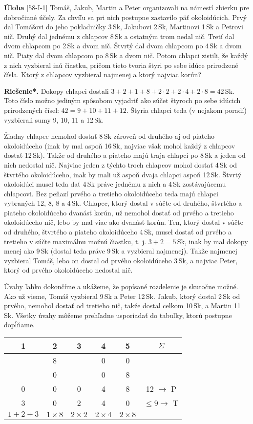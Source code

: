 \documentclass{article}
\newcommand{\rieh}{\textbf{Riešenie*.} }
\newcommand{\problem}[3]{
  \begin{tcolorbox}[breakable,notitle,boxrule=0pt,colback=light-gray,colframe=light-gray]
    \textbf{Úloha}
    [#1] #2
  \end{tcolorbox}
  \noindent#3
}
\begin{document}
\problem{58-I-1}{
Tomáš, Jakub, Martin a Peter organizovali na námestí zbierku pre dobročinné účely. Za chvíľu sa pri nich postupne zastavilo päť okoloidúcich. Prvý dal Tomášovi do jeho pokladničky 3\,Sk, Jakubovi 2\,Sk, Martinovi 1\,Sk a Petrovi nič. Druhý dal jednému
z chlapcov 8\,Sk a ostatným trom nedal nič. Tretí dal dvom chlapcom po 2\,Sk a dvom nič. Štvrtý dal dvom chlapcom po 4\,Sk a dvom nič. Piaty dal dvom chlapcom po 8\,Sk a dvom nič. Potom chlapci zistili, že každý z nich vyzbieral inú čiastku, pričom tieto
tvoria štyri po sebe idúce prirodzené čísla. Ktorý z chlapcov vyzbieral najmenej a ktorý
najviac korún?
}{
\rieh Dokopy chlapci dostali $3 + 2 + 1 + 8 + 2 \cdot 2 + 2 \cdot 4 + 2 \cdot 8 = 42$\,Sk. Toto
číslo možno jediným spôsobom vyjadriť ako súčet štyroch po sebe idúcich prirodzených
čísel: $42 = 9 + 10 + 11 + 12$. Štyria chlapci teda (v nejakom poradí) vyzbierali sumy 9,
10, 11 a 12\,Sk.

Žiadny chlapec nemohol dostať 8\,Sk zároveň od druhého aj od piateho okoloidúceho
(inak by mal aspoň 16\,Sk, najviac však mohol každý z chlapcov dostať 12\,Sk). Takže od
druhého a piateho majú traja chlapci po 8\,Sk a jeden od nich nedostal nič. Najviac jeden
z týchto troch chlapcov mohol dostať 4\,Sk od štvrtého okoloidúceho, inak by mali už
aspoň dvaja chlapci aspoň 12\,Sk. Štvrtý okoloidúci musel teda dať 4\,Sk práve jednému
z nich a 4\,Sk zostávajúcemu chlapcovi. Bez peňazí prvého a tretieho okoloidúceho
teda majú chlapci vybraných 12, 8, 8 a 4\,Sk. Chlapec, ktorý dostal v súčte od druhého,
štvrtého a piateho okoloidúceho dvanásť korún, už nemohol dostať od prvého a tretieho
okoloidúceho nič, lebo by mal viac ako dvanásť korún. Ten, ktorý dostal v súčte od
druhého, štvrtého a piateho okoloidúceho 4\,Sk, musel dostať od prvého a tretieho v súčte
maximálnu možnú čiastku, t. j. $3+2 = 5$\,Sk, inak by mal dokopy menej ako 9\,Sk (dostal
teda práve 9\,Sk a vyzbieral najmenej). Takže najmenej vyzbieral Tomáš, lebo on dostal
od prvého okoloidúceho 3\,Sk, a najviac Peter, ktorý od prvého okoloidúceho nedostal
nič.

Úvahy ľahko dokončíme a ukážeme, že popísané rozdelenie je skutočne možné. Ako
už vieme, Tomáš vyzbieral 9\,Sk a Peter 12\,Sk. Jakub, ktorý dostal 2\,Sk od prvého,
nemohol dostať od tretieho nič, takže dostal celkom 10\,Sk, a Martin 11\,Sk. Všetky
úvahy môžeme prehľadne usporiadať do tabuľky, ktorú postupne dopĺňame.
    \begin{tabular}{|c|c|c|c|c|c}
        1 & 2 & 3 & 4 & 5 & $\Sigma$  \\
        \hline
         & 8 & & 0 & 0 & \\
         \hline 
         & 0 & & 0 & 8 & \\
         \hline
         0 & 0 & 0 & 4 & 8 & 12 $\rightarrow$ P \\
         \hline
         3 & 0 & 2 & 4 & 0 & $\leq 9 \rightarrow $ T \\
         \hline
         $1+2+3$ & $1 \times 8$ & $2\times 2$  & $2 \times 4$ & $2 \times 8$  & \\ 
    
           \end{tabular}
}
\end{document}
